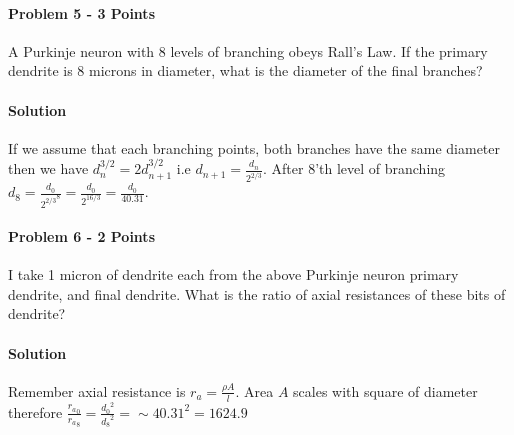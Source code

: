 \documentclass[a4paper,10pt]{article}
\begin{document}
\usetikzlibrary{shapes,shadows,circuits.ee.IEC}

\paragraph{Problem 5 - 3 Points}
A Purkinje neuron with 8 levels of branching obeys Rall’s Law. If the primary
dendrite is 8 microns in diameter, what is the diameter of the final branches?

\paragraph{Solution} If we assume that each branching points, both branches have
the same diameter then we have $d_n^{3/2} = 2 d_{n+1}^{3/2}$ i.e 
$d_{n+1} = \frac{d_n}{2^{2/3}}$. After 8'th level of branching 
$d_8 = \frac{d_0}{{2^{2/3}}^8} = \frac{d_0}{2^{16/3}} = \frac{d_0}{40.31}$.


\paragraph{Problem 6 - 2 Points}
I take 1 micron of dendrite each from the above Purkinje neuron primary
dendrite, and final dendrite. What is the ratio of axial resistances of these
bits of dendrite?

\paragraph{Solution} Remember axial resistance is $r_a = \frac{\rho A}{l}$.
Area $A$ scales with square of diameter therefore 
$\frac{{r_a}_0}{{r_a}_8} = \frac{{d_0}^2}{{d_8}^2} = \sim 40.31 ^ 2 = 1624.9$
\end{document}
